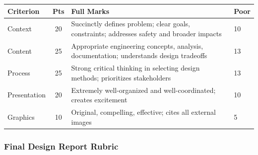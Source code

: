 {\small
\begin{longtable}{p{4cm} c p{5cm} p{3cm}}
\toprule
\textbf{Criterion} & \textbf{Pts} & \textbf{Full Marks} & \textbf{Poor} \\
\midrule
\endfirsthead
\bottomrule
\endfoot

Context & 20 & Succinctly defines problem; clear goals, constraints; addresses safety and broader impacts & 10 \\
\addlinespace
Content & 25 & Appropriate engineering concepts, analysis, documentation; understands design tradeoffs & 13 \\
\addlinespace
Process & 25 & Strong critical thinking in selecting design methods; prioritizes stakeholders & 13 \\
\addlinespace
Presentation & 20 & Extremely well-organized and well-coordinated; creates excitement & 10 \\
\addlinespace
Graphics & 10 & Original, compelling, effective; cites all external images & 5 \\

\end{longtable}
}

\subsubsection{Final Design Report Rubric}
\label{sssec:rubric-fdr-report}


